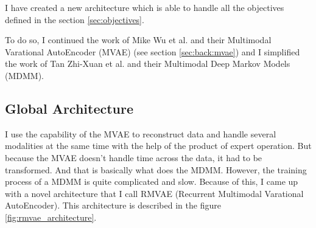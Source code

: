 \documentclass[12pt]{report}
\begin{document}
I have created a new architecture which is able to handle all the objectives defined in the section \ref{sec:objectives}.

To do so, I continued the work of Mike Wu et al. \cite{wu_multimodal_2018} and their Multimodal Varational AutoEncoder (MVAE) (see section \ref{sec:back:mvae}) and I simplified the work of Tan Zhi-Xuan et al. \cite{tan_factorized_2019} and their Multimodal Deep Markov Models (MDMM).

\subsection{Global Architecture}

I use the capability of the MVAE to reconstruct data and handle several modalities at the same time with the help of the product of expert operation.
But because the MVAE doesn't handle time across the data, it had to be transformed.
And that is basically what does the MDMM.
However, the training process of a MDMM is quite complicated and slow.
Because of this, I came up with a novel architecture that I call RMVAE (Recurrent Multimodal Varational AutoEncoder).
This architecture is described in the figure \ref{fig:rmvae_architecture}.
\end{document}

